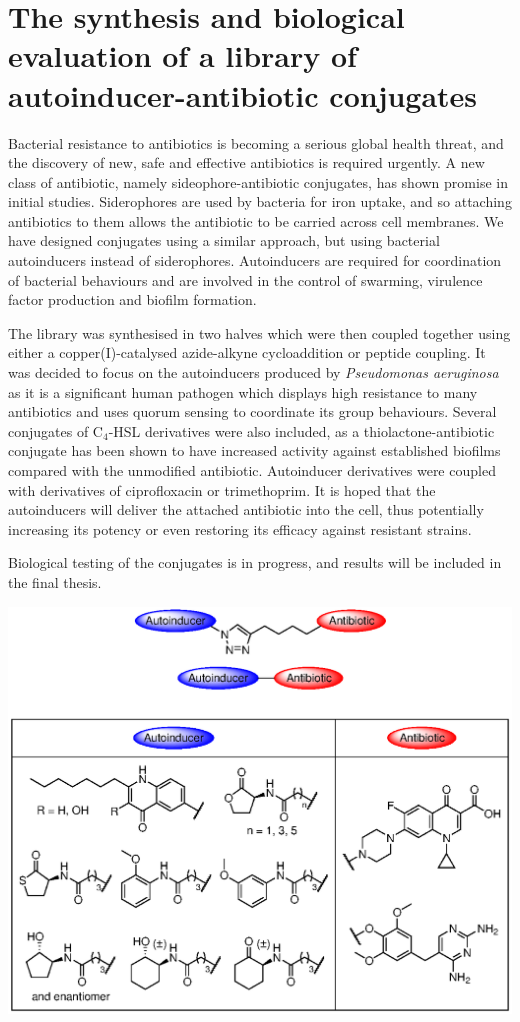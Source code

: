 \documentclass[10pt,a4paper]{article}
\begin{document}
\section*{The synthesis and biological evaluation of a library of autoinducer-antibiotic conjugates}

Bacterial resistance to antibiotics is becoming a serious global health threat, and the discovery of new, safe and effective antibiotics is required urgently\cite{ResistanceUS,davies2013drugs,ANIE:ANIE201209979}. A new class of antibiotic, namely sideophore-antibiotic conjugates, has shown promise in initial studies\cite{Page2013}. Siderophores are used by bacteria for iron uptake, and so attaching antibiotics to them allows the antibiotic to be carried across cell membranes. We have designed conjugates using a similar approach, but using bacterial autoinducers\cite{Waters2005} instead of siderophores. Autoinducers are required for coordination of bacterial behaviours and are involved in the control of swarming, virulence factor production and biofilm formation. 

The library was synthesised in two halves which were then coupled together using either a copper(I)-catalysed azide-alkyne cycloaddition\cite{Tornoe2002,ANIE:ANIE2596} or peptide coupling. It was decided to focus on the autoinducers produced by \textit{Pseudomonas aeruginosa} as it is a significant human pathogen\cite{Bodey1983} which displays high resistance to many antibiotics\cite{Poole2004} and uses quorum sensing to coordinate its group behaviours\cite{Dubern2008}.
Several conjugates of  C$_4$-HSL derivatives\cite{Galloway2011} were also included, as a thiolactone-antibiotic conjugate has been shown to have increased activity against established biofilms compared with the unmodified antibiotic\cite{Ganguly2011}.
Autoinducer derivatives were coupled with derivatives of ciprofloxacin or trimethoprim. It is hoped that the autoinducers will deliver the attached antibiotic into the cell, thus potentially increasing its potency or even restoring its efficacy against resistant strains.

Biological testing of the conjugates is in progress, and results will be included in the final thesis.
	
\begin{scheme}[H]
	\begin{center}
		\includegraphics[scale=1]{Summary_1}
	\end{center}
\end{scheme}

{}

\end{document}
